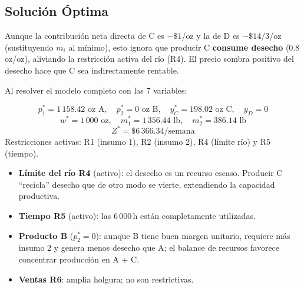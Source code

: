 \documentclass[12pt,a4paper]{article}
\begin{document}
\subsection{Solución Óptima}

Aunque la contribución neta directa de C es $-\$1$/oz y la de D es $-\$14/3$/oz
(sustituyendo $m_i$ al mínimo), esto ignora que producir C \textbf{consume desecho}
(0.8\,oz/oz), aliviando la restricción activa del río (R4). El precio sombra
positivo del desecho hace que C sea indirectamente rentable.

Al resolver el modelo completo con las 7 variables:

\begin{solucbox}
\[
  p_1^* = 1\,158.42\text{ oz A},\quad p_2^* = 0\text{ oz B},\quad
  y_C^* = 198.02\text{ oz C},\quad y_D = 0
\]
\[
  w^* = 1\,000\text{ oz},\quad m_1^* = 1\,356.44\text{ lb},\quad m_2^* = 386.14\text{ lb}
\]
\[
  \boxed{Z^* = \$6\,366.34/\text{semana}}
\]
Restricciones activas: R1 (insumo 1), R2 (insumo 2), R4 (límite río) y R5 (tiempo).
\end{solucbox}

\begin{sensbox}
\begin{itemize}[leftmargin=1.5em]
  \item \textbf{Límite del río R4} (activo): el desecho es un recurso escaso.
    Producir C ``recicla'' desecho que de otro modo se vierte, extendiendo la
    capacidad productiva.
  \item \textbf{Tiempo R5} (activo): las 6\,000\,h están completamente utilizadas.
  \item \textbf{Producto B} ($p_2^*=0$): aunque B tiene buen margen unitario,
    requiere más insumo 2 y genera menos desecho que A; el balance de recursos
    favorece concentrar producción en A + C.
  \item \textbf{Ventas R6}: amplia holgura; no son restrictivas.
\end{itemize}
\end{sensbox}
\end{document}
